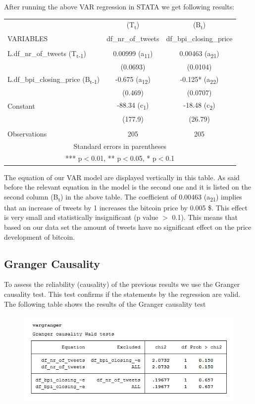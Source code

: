 \documentclass[a4paper,american,12pt]{article}
\begin{document}
\begin{spacing}{1.2}
After running the above VAR regression in STATA we get following results:
	
\begin{tabular}{lcc} \hline
 & (T\textsubscript{t}) & (B\textsubscript{t}) \\
VARIABLES & df\_nr\_of\_tweets & df\_bpi\_closing\_price \\ \hline
 &  &  \\
L.df\_nr\_of\_tweets (T\textsubscript{t-1}) & 0.00999 (a\textsubscript{11}) & 0.00463 (a\textsubscript{21}) \\
 & (0.0693) & (0.0104) \\
L.df\_bpi\_closing\_price (B\textsubscript{t-1}) & -0.675 (a\textsubscript{12}) & -0.125* (a\textsubscript{22}) \\
 & (0.469) & (0.0707) \\
Constant  & -88.34 (c\textsubscript{1}) & -18.48 (c\textsubscript{2}) \\
 & (177.9) & (26.79) \\
 &  &  \\
 Observations & 205 & 205 \\ \hline
\multicolumn{3}{c}{ Standard errors in parentheses} \\
\multicolumn{3}{c}{ *** p$<$0.01, ** p$<$0.05, * p$<$0.1} \\
\end{tabular}

The equation of our VAR model are displayed vertically in this table. As said before the relevant equation in the model is the second one and it is listed on the second column (B\textsubscript{t}) in the above table. The coefficient of 0.00463 (a\textsubscript{21}) implies that an increase of tweets by 1 increases the bitcoin price by 0.005 \$. This effect is very small and statistically insignificant (p value $>$ 0.1). This means that based on our data set the amount of tweets have no significant effect on the price development of bitcoin.
		
\subsection{Granger Causality}
To assess the reliability (causality) of the previous results we use the Granger causality test. This test confirms if the statements by the regression are valid. The following table shows the results of the Granger causality test\\

\begin{figure}[H]
\centering
\graphicspath{ {stata_export_graphs/} }
\includegraphics[scale=0.85]{granger_test.png}
\end{figure}


\end{spacing}
\end{document}
